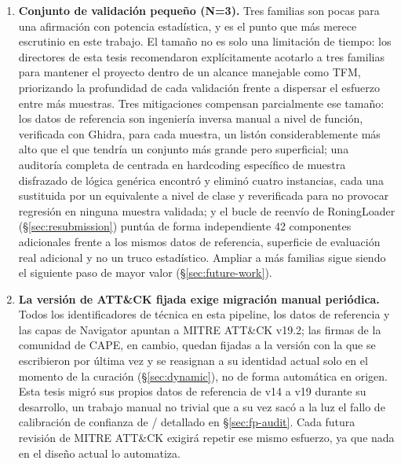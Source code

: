 \begin{enumerate}

\item \label{lim:n3} \textbf{Conjunto de validaci\'on peque\~no (N=3).} Tres familias
  son pocas para una afirmaci\'on con potencia estad\'istica, y es el
  punto que m\'as merece escrutinio en este trabajo. El tama\~no no es
  solo una limitaci\'on de tiempo: los directores de esta tesis
  recomendaron expl\'icitamente acotarlo a tres familias para mantener
  el proyecto dentro de un alcance manejable como TFM, priorizando la
  profundidad de cada validaci\'on frente a dispersar el esfuerzo entre
  m\'as muestras. Tres mitigaciones compensan parcialmente ese tama\~no:
  los datos de referencia son ingenier\'ia inversa manual a nivel de
  funci\'on, verificada con Ghidra, para cada muestra, un list\'on
  considerablemente m\'as alto que el que tendr\'ia un conjunto m\'as
  grande pero superficial; una auditor\'ia completa de
   centrada en hardcoding espec\'ifico de muestra
  disfrazado de l\'ogica gen\'erica encontr\'o y elimin\'o cuatro
  instancias, cada una sustituida por un equivalente a nivel de clase y
  reverificada para no provocar regresi\'on en ninguna muestra
  validada; y el bucle de reenv\'io de RoningLoader
  (\S\ref{sec:resubmission}) punt\'ua de forma independiente 42
  componentes adicionales frente a los mismos datos de referencia,
  superficie de evaluaci\'on real adicional y no un truco estad\'istico.
  Ampliar a m\'as familias sigue siendo el siguiente paso de mayor valor
  (\S\ref{sec:future-work}).

\item \label{lim:attck-version} \textbf{La versi\'on de ATT\&CK fijada
  exige migraci\'on manual peri\'odica.} Todos los identificadores de
  t\'ecnica en esta pipeline, los datos de referencia y las capas de
  Navigator apuntan a MITRE ATT\&CK v19.2; las firmas de la comunidad
  de CAPE, en cambio, quedan fijadas a la versi\'on con la que se
  escribieron por \'ultima vez y se reasignan a su identidad actual
  solo en el momento de la curaci\'on (\S\ref{sec:dynamic}), no de
  forma autom\'atica en origen. Esta tesis migr\'o sus propios datos de
  referencia de v14 a v19 durante su desarrollo, un trabajo manual no
  trivial que a su vez sac\'o a la luz el fallo de calibraci\'on de
  confianza de / detallado en
  \S\ref{sec:fp-audit}. Cada futura revisi\'on de MITRE ATT\&CK exigir\'a
  repetir ese mismo esfuerzo, ya que nada en el dise\~no actual lo
  automatiza.


\end{enumerate}
